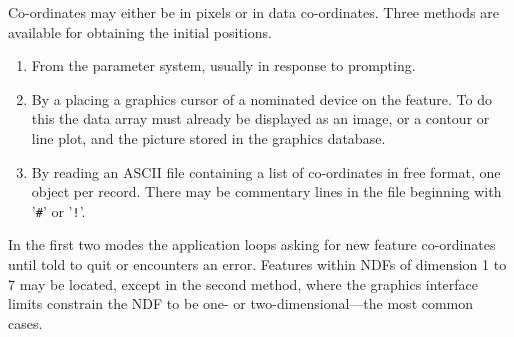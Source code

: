 {{{      Co-ordinates may either be in pixels or in data co-ordinates.
      Three methods are available for obtaining the initial positions.

      \begin{enumerate}
      \item From the parameter system, usually in response to prompting.
      \item By a placing a graphics cursor of a nominated device on the
         feature.  To do this the data array must already be
         displayed as an image, or a contour or line plot, and the
         picture stored in the graphics database.
      \item By reading an ASCII file containing a list of co-ordinates
         in free format, one object per record.  There may be
         commentary lines in the file beginning with '{\tt \#}' or
         '{\tt !}'.
      \end{enumerate}

      In the first two modes the application loops asking for new
      feature co-ordinates until told to quit or encounters an error.
      Features within NDFs of dimension 1 to 7 may be located, except
      in the second method, where the graphics interface limits
      constrain the NDF to be one- or two-dimensional---the most common
      cases.

}}}
